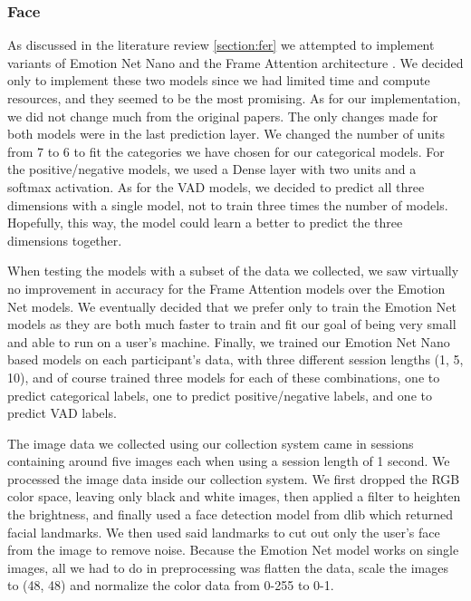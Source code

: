 \documentclass[../main.tex]{subfiles}
\begin{document}
    \newpage

    \subsubsection{Face}

    As discussed in the literature review \ref{section:fer} we attempted to implement variants of Emotion Net Nano
    \cite{emotionnet-nano} and the Frame Attention architecture \cite{fan}. 
    We decided only to implement these two models since we had limited time and compute resources, 
    and they seemed to be the most promising. As for our implementation, we did not change much from the original papers. 
    The only changes made for both models were in the last prediction layer. We changed the number of units from 7 to 6 to 
    fit the categories we have chosen for our categorical models. For the positive/negative models, we used a Dense layer with 
    two units and a softmax activation. As for the VAD models, we decided to predict all three dimensions with a single model, 
    not to train three times the number of models. Hopefully, this way, the model could learn a better to predict the three dimensions together.

    When testing the models with a subset of the data we collected,
    we saw virtually no improvement in accuracy for the Frame Attention models over the Emotion Net models. We eventually 
    decided that we prefer only to train the Emotion Net models as they are both much faster to train and fit our goal of being very 
    small and able to run on a user's machine. Finally, we trained our Emotion Net Nano based models on each participant's data, 
    with three different session lengths (1, 5, 10), and of course trained three models for each of these combinations, 
    one to predict categorical labels, one to predict positive/negative labels, and one to predict VAD labels. 

    The image data we collected using our collection system came in sessions containing around five images each when using a session length of 1 second. 
    We processed the image data inside our collection system. We first dropped the RGB color space, leaving only black and white images, 
    then applied a filter to heighten the brightness, and finally used a face detection model from dlib \cite{dlib} which returned facial landmarks. 
    We then used said landmarks to cut out only the user's face from the image to remove noise. Because the Emotion Net model works on single images, 
    all we had to do in preprocessing was flatten the data, scale the images to (48, 48) and normalize the color data from 0-255 to 0-1.
\end{document}

